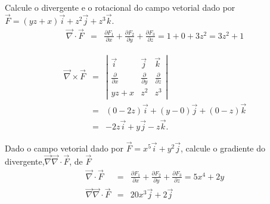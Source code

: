 \begin{ex} Calcule o divergente e o rotacional do campo vetorial dado por $\vec{F}=(yz+x)\vec{i}+z^2\vec{j}+z^3\vec{k}$.
\begin{eqnarray}
 \vec{\nabla}\cdot \vec{F} &=& \frac{\partial F_1}{\partial x}+\frac{\partial F_2}{\partial y}+\frac{\partial F_3}{\partial z} =
 1+0+3z^2=3z^2+1
\end{eqnarray}

\begin{eqnarray}
  \vec{\nabla}\times \vec{F}&=&\left|
 \begin{array}{ccc}
 \vec{i} & \vec{j} & \vec{k} \\
 \frac{\partial}{\partial x} &\frac{\partial}{\partial y} &\frac{\partial}{\partial z} \\
yz+x & z^2 & z^3
 \end{array}
\right|\\&=&\left(0-2z\right)\vec{i}+\left(y-0\right)\vec{j}+\left(0-z\right)\vec{k}\\
&=&-2z\vec{i}+y\vec{j}-z\vec{k}.
\end{eqnarray}
\end{ex}

\begin{ex} Dado o campo vetorial dado por $\vec{F}=x^5\vec{i}+y^2\vec{j}$, calcule o gradiente do divergente,$ \vec{\nabla} \vec{\nabla}\cdot \vec{F}$, de $\vec{F}$
\begin{eqnarray}
 \vec{\nabla}\cdot \vec{F} &=& \frac{\partial F_1}{\partial x}+\frac{\partial F_2}{\partial y}+\frac{\partial F_3}{\partial z} =
 5x^4+2y\\
 \vec{\nabla} \vec{\nabla}\cdot \vec{F}&=&20x^3\vec{j}+2\vec{j}
\end{eqnarray}
 \end{ex}

